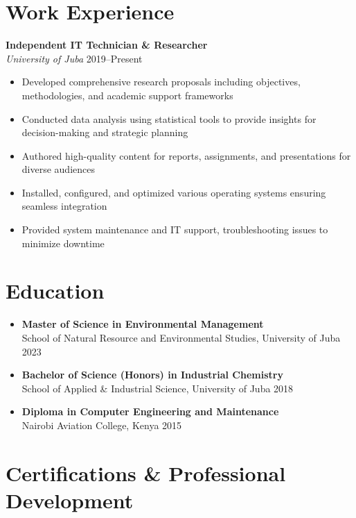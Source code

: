\documentclass[a4paper,10pt]{article}
\newcommand{\experience}[4]{\textbf{#1} \\ \textit{#2} \hfill #3 \\ #4}
\begin{document}
\section{Work Experience}
\experience{Independent IT Technician \& Researcher}{University of Juba}{2019--Present}
\begin{itemize}[noitemsep, leftmargin=*, topsep=0.2em]
    \item Developed comprehensive research proposals including objectives, methodologies, and academic support frameworks
    \item Conducted data analysis using statistical tools to provide insights for decision-making and strategic planning
    \item Authored high-quality content for reports, assignments, and presentations for diverse audiences
    \item Installed, configured, and optimized various operating systems ensuring seamless integration
    \item Provided system maintenance and IT support, troubleshooting issues to minimize downtime
\end{itemize}

\section{Education}
\begin{itemize}[noitemsep, leftmargin=*, label={}]
    \setlength{\itemsep}{0.3em}
    
    \item \textbf{Master of Science in Environmental Management} \\
          School of Natural Resource and Environmental Studies, University of Juba \hfill 2023
    
    \item \textbf{Bachelor of Science (Honors) in Industrial Chemistry} \\
          School of Applied \& Industrial Science, University of Juba \hfill 2018
    
    \item \textbf{Diploma in Computer Engineering and Maintenance} \\
          Nairobi Aviation College, Kenya \hfill 2015
\end{itemize}

\section{Certifications \& Professional Development}
\end{document}
